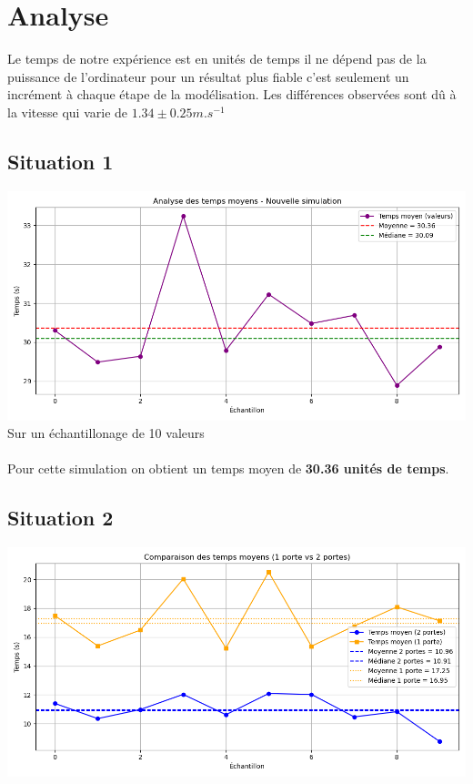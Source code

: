 \documentclass[a4paper,12pt]{article}
\begin{document}
\section{Analyse}
Le temps de notre expérience est en unités de temps il ne dépend pas de la puissance de l'ordinateur pour un résultat plus fiable c'est seulement un incrément à chaque étape de la modélisation. Les différences observées sont dû à la vitesse qui varie de $1.34 \pm 0.25 m.s^{-1}$
\subsection{Situation 1}

\includegraphics[width=\textwidth]{resultat.png} %
Sur un échantillonage de 10 valeurs
\\
\\
Pour cette simulation on obtient un temps moyen de \textbf{30.36 unités de temps}.
\subsection{Situation 2}


\includegraphics[width=\textwidth]{resultat_2.png} %
\end{document}
